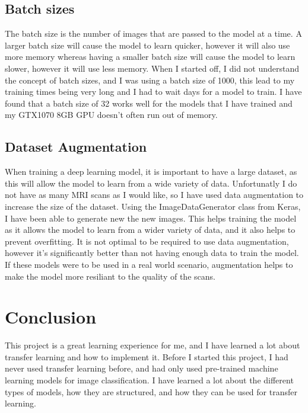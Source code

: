 \documentclass[]{final_report}
\begin{document}

\section{Batch sizes}

The batch size is the number of images that are passed to the model at a time.
A larger batch size will cause the model to learn quicker, however it will also use more memory whereas
having a smaller batch size will cause the model to learn slower, however it will use less memory.
When I started off, I did not understand the concept of batch sizes, and I was using a batch size of 1000, this lead to my training times
being very long and I had to wait days for a model to train.
I have found that a batch size of 32 works well for the models that I have trained and my GTX1070 8GB GPU\cite{GTX1070} doesn't often run out of memory.

\section{Dataset Augmentation}

When training a deep learning model, it is important to have a large dataset, as this will allow the model to learn from a wide variety of data.
Unfortunatly I do not have as many MRI scans as I would like, so I have used data augmentation to increase the size of the dataset.
Using the ImageDataGenerator class from Keras\cite{Keras}, I have been able to generate new the new images.
This helps training the model as it allows the model to learn from a wider variety of data, and it also helps to prevent overfitting.
It is not optimal to be required to use data augmentation, however it's significantly better than not having enough data to train the model.
If these models were to be used in a real world scenario, augmentation helps to make the model more resiliant to the quality of the scans.

\chapter{Conclusion}

This project is a great learning experience for me, and I have learned a lot about transfer learning and how to implement it.
Before I started this project, I had never used transfer learning before, and had only used pre-trained machine learning models for image classification.
I have learned a lot about the different types of models, how they are structured, and how they can be used for transfer learning.
\end{document}

